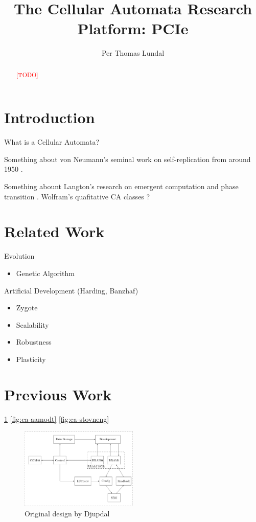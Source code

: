 \documentclass[a4paper]{IEEEtran}
\title{The Cellular Automata Research Platform: PCIe}
\author{Per Thomas Lundal}
\newcommand\TODO{\textcolor{red}{[TODO]}}
\begin{document}
\maketitle

\begin{abstract}

\TODO

\end{abstract}

\section{Introduction}

What is a Cellular Automata?

Something about von Neumann's seminal work on self-replication from around 1950 \cite{neumann1966selfreplication}.

Something abount Langton's research on emergent computation and phase transition \cite{langton1990edgeofchaos}.
Wolfram's quafitative CA classes \cite{wolfram1984complexity}?

\section{Related Work}

Evolution
\begin{itemize}
    \item Genetic Algorithm
\end{itemize}

Artificial Development (Harding, Banzhaf)
\begin{itemize}
    \item Zygote
    \item Scalability
    \item Robustness
    \item Plasticity
\end{itemize}

\section{Previous Work}

\ref{fig:ca-djupdal}
\ref{fig:ca-aamodt}
\ref{fig:ca-stovneng}

\cite{djupdal2003sblock}
\cite{aamodt2005sblock}
\cite{stovneng2014sblock}

\begin{figure}[h!]
    \centering
    \includegraphics[width=0.5\textwidth]{figures/ca-djupdal}
    \caption{Original design by Djupdal}
    \label{fig:ca-djupdal}
\end{figure}
\end{document}
